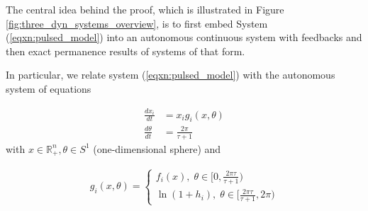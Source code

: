 \documentclass{article}
\theoremstyle{definition}
\begin{document}
The central idea behind the proof, which is illustrated in Figure \ref{fig:three_dyn_systems_overview}, is to first embed System (\ref{eqxn:pulsed_model}) into an autonomous continuous system with feedbacks and then exact permanence results of systems of that form.

In particular, we relate system (\ref{eqxn:pulsed_model}) with the autonomous system of equations

\begin{align}\label{auto}
     \frac{dx_i}{dt} &= x_ig_i(x, \theta)\\
    \frac{d\theta}{dt} &=\frac{2\pi}{\tau+1} \label{auto2}
\end{align}
with $x \in \mathbb{R}_+^n, \theta \in S^1 $ (one-dimensional sphere) and 

\begin{align}
    g_i(x, \theta) = \begin{cases}
        f_i(x), \; \theta \in [0,\frac{2\pi\tau}{\tau+1}) \\
        \ln(1+h_i), \; \theta \in [\frac{2\pi \tau}{\tau + 1},2\pi)
    \end{cases}
\end{align}
\end{document}
